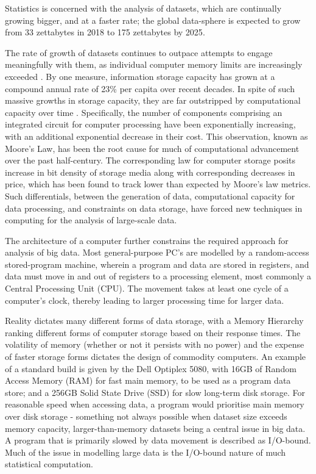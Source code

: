 Statistics is concerned with the analysis of datasets, which are continually growing bigger, and at a faster rate; the global data-sphere is expected to grow from 33 zettabytes in 2018 to 175 zettabytes by 2025\cite{rydning2018digitization}.

The rate of growth of datasets continues to outpace attempts to engage meaningfully with them, as individual computer memory limits are increasingly exceeded \cite{kleppmann2017dataintensive}.
By one measure, information storage capacity has grown at a compound annual rate of 23\% per capita over recent decades\cite{hilbert2011world}.
In spite of such massive growths in storage capacity, they are far outstripped by computational capacity over time \cite{fontana2018moore}.
Specifically, the number of components comprising an integrated circuit for computer processing have been exponentially increasing, with an additional exponential decrease in their cost\cite{moore1975progress}.
This observation, known as Moore's Law, has been the root cause for much of computational advancement over the past half-century.
The corresponding law for computer storage posits increase in bit density of storage media along with corresponding decreases in price, which has been found to track lower than expected by Moore's law metrics.
Such differentials, between the generation of data, computational capacity for data processing, and constraints on data storage, have forced new techniques in computing for the analysis of large-scale data.

The architecture of a computer further constrains the required approach for analysis of big data.
Most general-purpose PC's are modelled by a random-access stored-program machine, wherein a program and data are stored in registers, and data must move in and out of registers to a processing element, most commonly a Central Processing Unit (CPU).
The movement takes at least one cycle of a computer's clock, thereby leading to larger processing time for larger data.

Reality dictates many different forms of data storage, with a Memory Hierarchy ranking different forms of computer storage based on their response times\cite{toy1986computer}.
The volatility of memory (whether or not it persists with no power) and the expense of faster storage forms dictates the design of commodity computers.
An example of a standard build is given by the Dell Optiplex 5080, with 16GB of Random Access Memory (RAM) for fast main memory, to be used as a program data store; and a 256GB Solid State Drive (SSD) for slow long-term disk storage\cite{cornell2021standardcomp}.
For reasonable speed when accessing data, a program would prioritise main memory over disk storage - something not always possible when dataset size exceeds memory capacity, larger-than-memory datasets being a central issue in big data.
A program that is primarily slowed by data movement is described as I/O-bound.
Much of the issue in modelling large data is the I/O-bound nature of much statistical computation.

